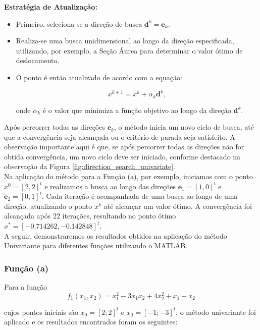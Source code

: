\documentclass[a4paper, 12pt]{article}
\begin{document}
\textbf{Estratégia de Atualização:} 

\begin{itemize}
    \item Primeiro, seleciona-se a direção de busca $\mathbf{d}^k = \mathbf{e}_k$.
    \item Realiza-se uma busca unidimensional ao longo da direção especificada, utilizando, por exemplo, a Seção Áurea para determinar o valor ótimo de deslocamento.
    \item O ponto é então atualizado de acordo com a equação:

    \begin{equation*}
        x^{k+1} = x^k + \alpha_k \mathbf{d}^k,
    \end{equation*}

    onde $\alpha_k$ é o valor que minimiza a função objetivo ao longo da direção $\mathbf{d}^k$.
\end{itemize}

Após percorrer todas as direções $\mathbf{e}_k$, o método inicia um novo ciclo de busca, até que a convergência seja alcançada ou o critério de parada seja satisfeito. A observação importante aqui é que, se após percorrer todas as direções não for obtida convergência, um novo ciclo deve ser iniciado, conforme destacado na observação da Figura \ref{fig:direction_search_univariate}.\\


Na aplicação do método para a Função (a), por exemplo, iniciamos com o ponto $x^0 = [2, 2]^t$ e realizamos a busca ao longo das direções $\mathbf{e}_1 = [1, 0]^t$ e $\mathbf{e}_2 = [0, 1]^t$. Cada iteração é acompanhada de uma busca ao longo de uma direção, atualizando o ponto $x^k$ até alcançar um valor ótimo. A convergência foi alcançada após 22 iterações, resultando no ponto ótimo $x^* = [-0.714262, -0.142848]^t$.\\

A seguir, demonstraremos os resultados obtidos na aplicação do método Univariante para diferentes funções  utilizando o MATLAB.\\



\subsubsection{Função (a)}

Para a função 
\[
f_1(x_1, x_2) = x_1^2 - 3x_1x_2 + 4x_2^2 + x_1 - x_2
\]

cujos pontos iniciais são $x_0 = [2; 2]^t$ e $x_0 = [-1; -3]^t$, o método univariante foi aplicado e os resultados encontrados foram os seguintes:
\end{document}

